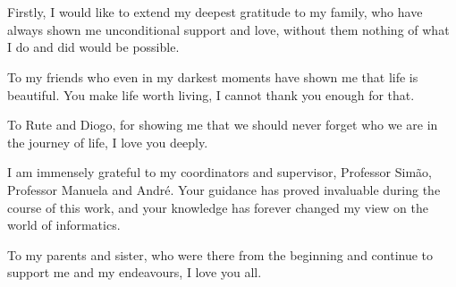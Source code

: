 \documentclass[11pt,twoside]{estiloUBI}
\begin{document}
\onehalfspacing





\pagestyle{fancy}


\cleardoublepage


\newpage




\newpage
\section*{}
\vspace{0.5cm}
Firstly, I would like to extend my deepest gratitude to my family, who have always shown me unconditional support and love, without them nothing of what I do and did would be possible.

To my friends who even in my darkest moments have shown me that life is beautiful. You make life worth living, I cannot thank you enough for that.

To Rute and Diogo, for showing me that we should never forget who we are in the journey of life, I love you deeply.

I am immensely grateful to my coordinators and supervisor, Professor Simão, Professor Manuela and André. Your guidance has proved invaluable during the course of this work, and your knowledge has forever changed my view on the world of informatics.

To my parents and sister, who were there from the beginning and continue to support me and my endeavours, I love you all.
\cleardoublepage
\end{document}
